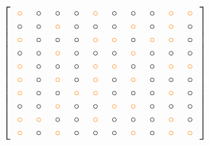 \documentclass[12pt]{article}
\begin{document}
$$\left[\begin{tabular}{cccccccccc}
\color{orange}{$\circ$} & \color{black}{$\circ$} & \color{black}{$\circ$} & \color{black}{$\circ$} & \color{orange}{$\circ$} & \color{black}{$\circ$} & \color{black}{$\circ$} & \color{black}{$\circ$} & \color{orange}{$\circ$} & \color{orange}{$\circ$}  \\
\color{black}{$\circ$} & \color{black}{$\circ$} & \color{orange}{$\circ$} & \color{black}{$\circ$} & \color{black}{$\circ$} & \color{black}{$\circ$} & \color{orange}{$\circ$} & \color{black}{$\circ$} & \color{orange}{$\circ$} & \color{black}{$\circ$}  \\
\color{orange}{$\circ$} & \color{black}{$\circ$} & \color{black}{$\circ$} & \color{black}{$\circ$} & \color{orange}{$\circ$} & \color{orange}{$\circ$} & \color{black}{$\circ$} & \color{orange}{$\circ$} & \color{orange}{$\circ$} & \color{black}{$\circ$}  \\
\color{black}{$\circ$} & \color{black}{$\circ$} & \color{orange}{$\circ$} & \color{black}{$\circ$} & \color{black}{$\circ$} & \color{black}{$\circ$} & \color{orange}{$\circ$} & \color{black}{$\circ$} & \color{black}{$\circ$} & \color{black}{$\circ$}  \\
\color{orange}{$\circ$} & \color{black}{$\circ$} & \color{black}{$\circ$} & \color{black}{$\circ$} & \color{orange}{$\circ$} & \color{orange}{$\circ$} & \color{black}{$\circ$} & \color{black}{$\circ$} & \color{orange}{$\circ$} & \color{orange}{$\circ$}  \\
\color{orange}{$\circ$} & \color{black}{$\circ$} & \color{orange}{$\circ$} & \color{black}{$\circ$} & \color{orange}{$\circ$} & \color{black}{$\circ$} & \color{orange}{$\circ$} & \color{black}{$\circ$} & \color{black}{$\circ$} & \color{black}{$\circ$}  \\
\color{orange}{$\circ$} & \color{black}{$\circ$} & \color{black}{$\circ$} & \color{orange}{$\circ$} & \color{orange}{$\circ$} & \color{black}{$\circ$} & \color{black}{$\circ$} & \color{black}{$\circ$} & \color{orange}{$\circ$} & \color{black}{$\circ$}  \\
\color{black}{$\circ$} & \color{black}{$\circ$} & \color{orange}{$\circ$} & \color{black}{$\circ$} & \color{black}{$\circ$} & \color{orange}{$\circ$} & \color{orange}{$\circ$} & \color{black}{$\circ$} & \color{black}{$\circ$} & \color{black}{$\circ$}  \\
\color{orange}{$\circ$} & \color{orange}{$\circ$} & \color{black}{$\circ$} & \color{black}{$\circ$} & \color{orange}{$\circ$} & \color{black}{$\circ$} & \color{black}{$\circ$} & \color{black}{$\circ$} & \color{orange}{$\circ$} & \color{black}{$\circ$}  \\
\color{orange}{$\circ$} & \color{black}{$\circ$} & \color{orange}{$\circ$} & \color{black}{$\circ$} & \color{black}{$\circ$} & \color{black}{$\circ$} & \color{orange}{$\circ$} & \color{black}{$\circ$} & \color{orange}{$\circ$} & \color{orange}{$\circ$}  \\
\end{tabular}\right]$$
\end{document}
